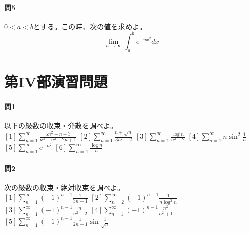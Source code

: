 \documentclass[a4j,dvipdfmx]{jsarticle}
\begin{document}
                \paragraph{問5}$0<a<b$とする。この時、次の値を求めよ。
                    \begin{equation*}
                        \lim_{n\to\infty}\int_{a}^{b}e^{-nx^2}dx
                    \end{equation*}
        \clearpage
        \section{第IV部演習問題}
            \paragraph{問1}以下の級数の収束・発散を調べよ。\\
            $\displaystyle [1]\sum_{n=1}^{\infty}\frac{5n^2-n+3}{n^3+n^2-2n+1}$\hspace{3mm}
            $\displaystyle [2]\sum_{n=1}^{\infty}\frac{n+\sqrt{n}}{3n^2-2}$\hspace{3mm}
            $\displaystyle [3]\sum_{n=1}^{\infty}\frac{\log n}{n^2+2}$\hspace{3mm}
            $\displaystyle [4]\sum_{n=1}^{\infty}n\sin^2\frac{1}{n}$\hspace{3mm}
            $\displaystyle [5]\sum_{n=1}^{\infty}e^{-n^2}$\hspace{3mm}
            $\displaystyle [6]\sum_{n=1}^{\infty}\frac{\log n}{n}$

            \paragraph{問2}次の級数の収束・絶対収束を調べよ。\\
            $\displaystyle [1]\sum_{n=1}^{\infty}(-1)^{n-1}\frac{1}{3n-1}$\hspace{3mm}
            $\displaystyle [2]\sum_{n=2}^{\infty}(-1)^{n-1}\frac{1}{n\log^2 n}$\hspace{3mm}
            $\displaystyle [3]\sum_{n=1}^{\infty}(-1)^{n-1}\frac{n}{n^2+2}$\hspace{3mm}
            $\displaystyle [4]\sum_{n=1}^{\infty}(-1)^{n-1}\frac{n^2}{n^2+1}$\hspace{3mm}
            $\displaystyle [5]\sum_{n=1}^{\infty}(-1)^{n-1}\frac{1}{2n-1}\sin\frac{1}{\sqrt{n}}$\hspace{3mm}
\end{document}
